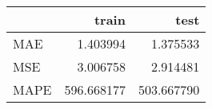 \begin{tabular}{lrr}
\toprule
{} &       train &        test \\
\midrule
MAE  &    1.403994 &    1.375533 \\
MSE  &    3.006758 &    2.914481 \\
MAPE &  596.668177 &  503.667790 \\
\bottomrule
\end{tabular}
